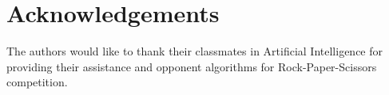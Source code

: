 
\section{Acknowledgements} 
\label{sec:ack} 

The authors would like to thank their classmates in Artificial Intelligence for providing their assistance and opponent algorithms for Rock-Paper-Scissors competition.
